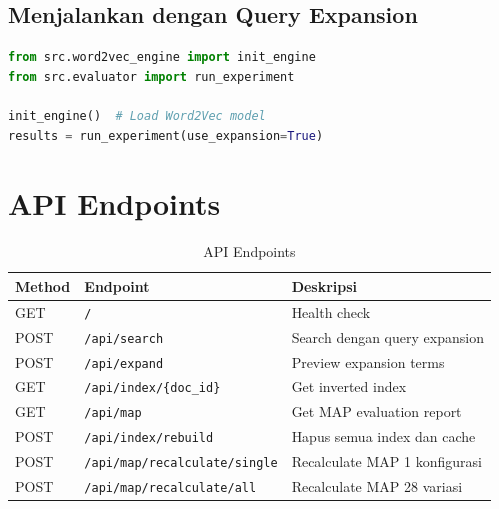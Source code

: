 \documentclass[12pt,a4paper]{report}
\begin{document}
\subsection{Menjalankan dengan Query Expansion}
\begin{lstlisting}[language=python]
from src.word2vec_engine import init_engine
from src.evaluator import run_experiment

init_engine()  # Load Word2Vec model
results = run_experiment(use_expansion=True)
\end{lstlisting}

\section{API Endpoints}
\begin{table}[H]
    \centering
    \small
    \begin{tabular}{@{}lll@{}}
        \toprule
        \textbf{Method} & \textbf{Endpoint} & \textbf{Deskripsi} \\
        \midrule
        GET & \texttt{/} & Health check \\
        POST & \texttt{/api/search} & Search dengan query expansion \\
        POST & \texttt{/api/expand} & Preview expansion terms \\
        GET & \texttt{/api/index/\{doc\_id\}} & Get inverted index \\
        GET & \texttt{/api/map} & Get MAP evaluation report \\
        POST & \texttt{/api/index/rebuild} & Hapus semua index dan cache \\
        POST & \texttt{/api/map/recalculate/single} & Recalculate MAP 1 konfigurasi \\
        POST & \texttt{/api/map/recalculate/all} & Recalculate MAP 28 variasi \\
        \bottomrule
    \end{tabular}
    \caption{API Endpoints}
\end{table}
\end{document}
